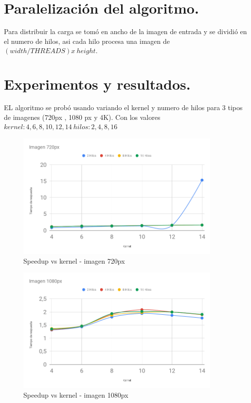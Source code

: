 \documentclass{IEEEtran}
\begin{document}
\section{Paralelización del algoritmo.}
Para distribuir la carga se tomó en ancho de la imagen de entrada
 y se dividió en el numero de hilos, asi cada hilo procesa una 
 imagen de $(width/THREADS) x \ height$.



\section{Experimentos y resultados.}
EL algoritmo se probó usando variando el kernel y numero de hilos para
3 tipos de imagenes (720px , 1080 px y 4K). Con los valores 
$kernel:{4,6,8,10,12,14} \ hilos:{2,4,8,16} $
\\

\begin{figure}[h]
\centering
\includegraphics[width=4.0in]{imagen-720px.png}
\caption{Speedup vs kernel - imagen 720px }
\label{fig_sim}
\end{figure}

\begin{figure}[!t]
\centering
\includegraphics[width=4.0in]{imagen-1080px.png}
\caption{Speedup vs kernel - imagen 1080px }
\label{fig_sim}
\end{figure}
\end{document}
